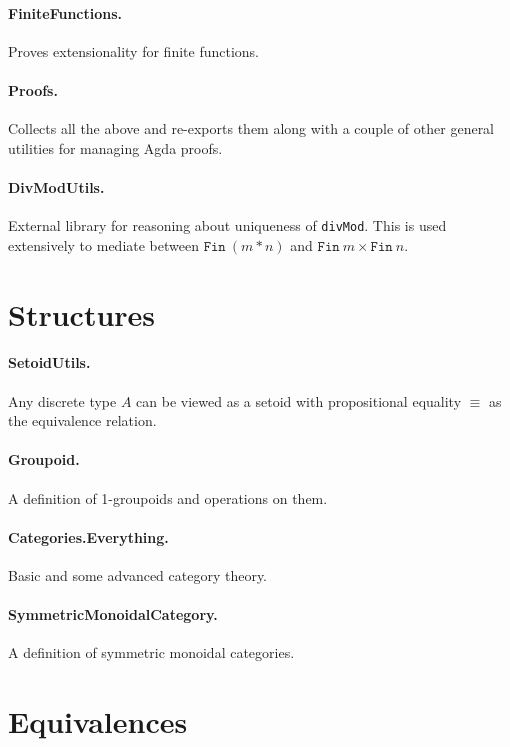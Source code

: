 \documentclass{article}
\begin{document}
\paragraph*{FiniteFunctions.} Proves extensionality for finite functions. 

\paragraph*{Proofs.} Collects all the above and re-exports them along
with a couple of other general utilities for managing Agda proofs.

\paragraph*{DivModUtils.} External library for reasoning about
uniqueness of \texttt{divMod}. This is used extensively to mediate
between $\texttt{Fin}~(m*n)$ and
$\texttt{Fin}~m \times \texttt{Fin}~n$.

\section{Structures}

\paragraph*{SetoidUtils.} Any discrete type $A$ can be viewed as a
setoid with propositional equality $\equiv$ as the equivalence
relation.

\paragraph*{Groupoid.} A definition of 1-groupoids and operations on 
them. 

\paragraph*{Categories.Everything.} Basic and some advanced category theory.

\paragraph*{SymmetricMonoidalCategory.} A definition of symmetric
monoidal categories.

\section{Equivalences} 
\end{document}
